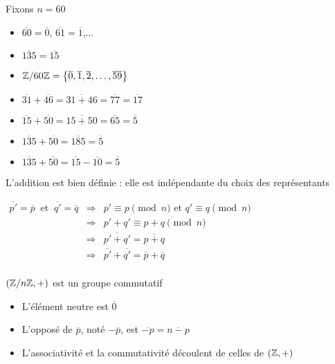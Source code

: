 \begin{frame}

\begin{exemple}
Fixons $n=60$
\begin{itemize}
  \item $\overline{60}=\overline{0}$, $\overline{61}=\overline{1}$,...
\pause
  \item $\overline{135} = \overline{15}$
\pause
  \item $\mathbb{Z}/60\mathbb{Z}= \big\{\overline{0},\overline{1},
\overline{2},\ldots,\overline{59}\big\}$
\pause
  \item $\overline{31} + \overline{46}  = \overline{31 + 46} =\overline{77} = \overline{17}$
\pause
  \item $\overline{15} + \overline{50}  = \overline{15 + 50} =\overline{65} = \overline{5}$
\pause
  \item $\overline{135}+\overline{50} = \overline{185} = \overline{5}$
\pause
  \item $\overline{135}+\overline{50} = \overline{15} - \overline{10} = \overline{5}$
\end{itemize}
\end{exemple}

\pause
\medskip

L'addition est bien définie : elle est indépendante du choix des représentants

\pause

$\begin{array}{rcl}
 \overline{p'}= \overline p \ \text{ et } \ \overline{q'} = \overline q 
    & \Rightarrow & p' \equiv p \pmod n \text{ et } q' \equiv q \pmod n \\
    & \Rightarrow & p'+q' \equiv p+q \pmod n \\
    & \Rightarrow & \overline{p'+q'} = \overline{p+q} \\
    & \Rightarrow & \overline{p'}+\overline{q'} = \overline p + \overline q \\
\end{array}
$

\end{frame}



\begin{frame}

\begin{proposition}
$(\mathbb{Z}/n\mathbb{Z},+)$ est un groupe commutatif 
\end{proposition}

\pause

\begin{itemize}
  \item L'élément neutre est $\overline{0}$
\pause
  \item L'opposé de $\overline p$, noté $-\overline{p}$, est $\overline{-p}=\overline{n-p}$
\pause
  \item L'associativité et la commutativité découlent de celles de $(\mathbb{Z},+)$
\end{itemize}

\end{frame}






